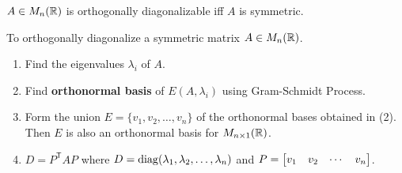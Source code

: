 \begin{theorem}
\leavevmode
$A \in M_n(\mathbb{R})$ is orthogonally diagonalizable iff $A$ is symmetric.
\end{theorem}

\lline

To orthogonally diagonalize a symmetric matrix $A \in M_n(\mathbb{R})$.
\begin{enumerate}
    \item Find the eigenvalues $\lambda_i$ of $A$.
    \item Find \textbf{orthonormal basis} of $E(A, \lambda_i)$ using Gram-Schmidt Process.
    \item Form the union $E = \{v_1, v_2, \dots, v_n\}$ of the orthonormal bases obtained in (2). Then $E$ is also an orthonormal basis for $M_{n\times 1}(\mathbb{R})$.
    \item $D = P^{\mathsf{T}} AP$ where $D = \operatorname{diag}(\lambda_1, \lambda_2, \dots, \lambda_n)$ and $P = \begin{bmatrix} v_1 & v_2 & \cdots & v_n \end{bmatrix}$.
\end{enumerate}


